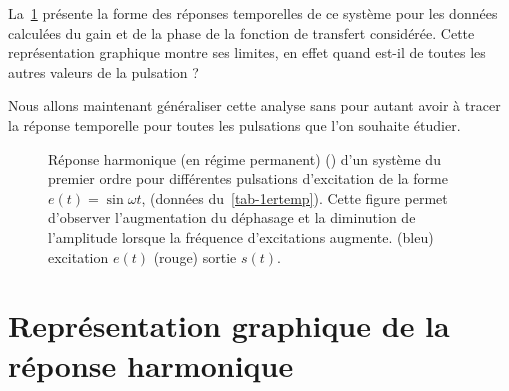 La~\cref{fig-repham} présente la forme des réponses temporelles de ce système 
pour les données calculées du gain et de la phase de la fonction de transfert 
considérée. Cette représentation graphique montre ses limites, en effet quand
est-il de toutes les autres valeurs de la pulsation ? 

Nous allons maintenant généraliser cette analyse sans pour autant avoir à 
tracer la réponse temporelle pour toutes les pulsations que l'on souhaite 
étudier.
\begin{figure}[!h]
    \centering
    
    
    
    \caption{Réponse harmonique (en régime permanent) () d'un 
             système du premier ordre pour différentes pulsations d'excitation 
             de la forme $e(t)=\sin{\omega t}$, (données du~\cref{tab-1ertemp}).
             Cette figure permet d'observer l'augmentation du déphasage et la 
             diminution de l'amplitude lorsque la fréquence d'excitations 
             augmente. (bleu) excitation $e(t)$ (rouge) sortie $s(t)$.
             \label{fig-repham}}
\end{figure}


\newpage
\section{Représentation graphique de la réponse harmonique}

